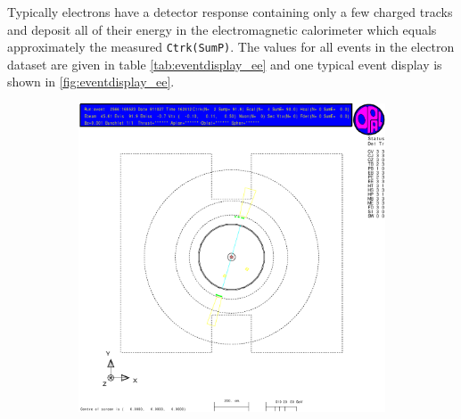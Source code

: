 \documentclass[11pt, a4paper]{article}
\numberwithin{equation}{section}
\begin{document}
Typically electrons have a detector response containing only a few charged tracks and deposit all of their energy in the electromagnetic calorimeter which equals approximately the measured \texttt{Ctrk(SumP)}.
The values for all events in the electron dataset are given in table \ref{tab:eventdisplay_ee} and one typical event display is shown in \ref{fig:eventdisplay_ee}.
\begin{figure}[h]
	\centering
	\begin{subfigure}{\textwidth}
		\centering
		\includegraphics[width=.9\textwidth]{./data/tag1/ee_pics/cropped/ee_02}
	\end{subfigure}
\end{figure}
\end{document}

